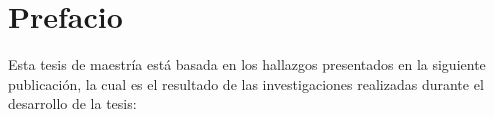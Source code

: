 
\chapter*{Prefacio}

Esta tesis de maestría está basada en los hallazgos presentados en la siguiente publicación, la cual es el resultado de las investigaciones realizadas durante el desarrollo de la tesis:





